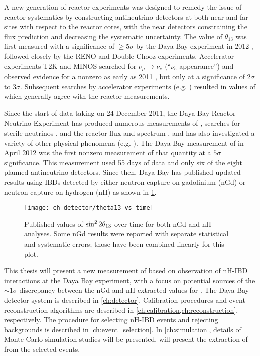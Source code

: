 A new generation of reactor experiments
was designed to remedy the issue of reactor systematics
by constructing antineutrino detectors at both near and far sites
with respect to the reactor cores,
with the near detectors constraining the \nuebar{} flux prediction
and decreasing the systematic uncertainty.
The value of $\theta_{13}$ was first measured
with a significance of $\geq 5\sigma$
by the Daya Bay experiment in 2012 \cite{ngd2012},
followed closely by the RENO \cite{reno2012}
and Double Chooz \cite{doublechooz2012} experiments.
Accelerator experiments T2K and MINOS
searched for $\nu_\mu\to\nu_e$ (``$\nu_e$ appearance'')
and observed evidence for a nonzero \thetaot{}
as early as 2011 \cite{t2k2011,minos2011},
but only at a significance of $2\sigma$ to $3\sigma$.
Subsequent searches by accelerator experiments (e.g. \cite{t2k2018})
resulted in values of \thetaot{} which generally agree
with the reactor measurements.

Since the start of data taking on 24 December 2011,
the Daya Bay Reactor Neutrino Experiment has produced numerous measurements of
\thetaot{}, searches for sterile neutrinos \cite{dyb_sterile2020},
and the reactor \nuebar{} flux and spectrum \cite{dyb_spec_decomp2019},
and has also investigated
a variety of other physical phenomena (e.g. \cite{dyb_cpt2018}).
The Daya Bay measurement of \thetaot{} in April 2012
was the first nonzero measurement of that quantity
at a $5\sigma$ significance.
This measurement used 55 days of \nuebar{} data
and only six of the eight planned antineutrino detectors.
Since then, Daya Bay has published updated results using IBDs detected by
either neutron capture on gadolinium (nGd)
\cite{ngd2012,ngd2013,ngd2014,ngd2015,ngd2016,ngd2018}
or neutron capture on hydrogen (nH)
\cite{nh2014,nh2016}
as shown in \cref{fig:theta13_vs_t}.

\begin{figure}
    \centering
    \texttt{[image: ch\_detector/theta13\_vs\_time]}
    \caption{
        Published values of $\sin^{2}2\theta_{13}$ over time
        for both nGd and nH analyses.
        Some nGd results were reported with separate statistical
        and systematic errors;
        those have been combined linearly for this plot.
    }
    \label{fig:theta13_vs_t}
\end{figure}

This thesis will present a new measurement of \thetaot{}
based on observation of nH-IBD interactions
at the Daya Bay experiment,
with a focus on potential sources of the $\sim1\sigma$ discrepancy
between the nGd and nH extracted values for \thetaot{}.
The Daya Bay detector system is described in \cref{ch:detector}.
Calibration procedures and event reconstruction algorithms
are described in \cref{ch:calibration,ch:reconstruction}, respectively.
The procedure for selecting nH-IBD events and rejecting backgrounds
is described in \cref{ch:event_selection}.
In \cref{ch:simulation}, details of Monte Carlo simulation studies
will be presented.
 will present the extraction of \thetaot{}
from the selected events.
